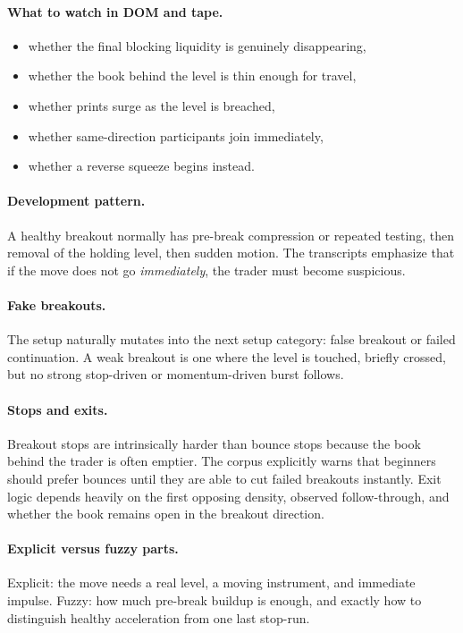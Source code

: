 \paragraph{What to watch in DOM and tape.}
\begin{itemize}
\item whether the final blocking liquidity is genuinely disappearing,
\item whether the book behind the level is thin enough for travel,
\item whether prints surge as the level is breached,
\item whether same-direction participants join immediately,
\item whether a reverse squeeze begins instead.
\end{itemize}

\paragraph{Development pattern.} A healthy breakout normally has pre-break compression or repeated testing, then removal of the holding level, then sudden motion. The transcripts emphasize that if the move does not go \emph{immediately}, the trader must become suspicious.

\paragraph{Fake breakouts.} The setup naturally mutates into the next setup category: false breakout or failed continuation. A weak breakout is one where the level is touched, briefly crossed, but no strong stop-driven or momentum-driven burst follows.

\paragraph{Stops and exits.} Breakout stops are intrinsically harder than bounce stops because the book behind the trader is often emptier. The corpus explicitly warns that beginners should prefer bounces until they are able to cut failed breakouts instantly. Exit logic depends heavily on the first opposing density, observed follow-through, and whether the book remains open in the breakout direction.

\paragraph{Explicit versus fuzzy parts.} Explicit: the move needs a real level, a moving instrument, and immediate impulse. Fuzzy: how much pre-break buildup is enough, and exactly how to distinguish healthy acceleration from one last stop-run.

